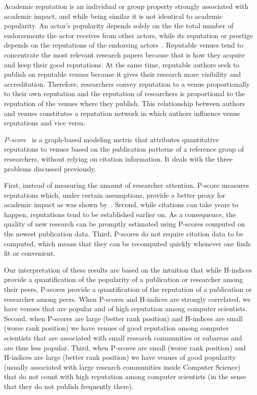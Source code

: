 \documentclass[man]{apa6}
\let \citeA \textcite
\let \cite \parencite
\begin{document}
Academic reputation is an individual or group property strongly associated with 
academic impact, and while being similar it is not identical to academic popularity. An 
actor's popularity depends solely on the the total number of endorsements
the actor receives from other actors, while its reputation or prestige depends on the 
reputations of the endorsing actors~\cite{Bollen2006}. Reputable venues tend to 
concentrate the most relevant research papers 
because that is how they acquire and keep their good reputations. At the same time, 
reputable authors seek to publish on reputable venues because it gives their 
research more visibility and accreditation. Therefore, researchers convey reputation
to a venue proportionally to their own reputation and the reputation of researchers
is proportional to the reputation of the venues where they publish.
This relationship between authors and venues constitutes a reputation network in which 
authors influence venue reputations and vice versa. 

{\em P-score}~\cite{Ribas2015a} is a graph-based modeling metric that attributes quantitative
reputations to venues based on the publication patterns of a reference group of researchers,
without relying on citation information. It deals with the three problems discussed previously. 

First, instead of measuring the amount of researcher attention, P-score measures reputations
which, under certain assumptions, provide a better proxy for academic impact as was shown by~\citeA{Ribas2015a}. Second, while citations can take years to happen, reputations 
tend to be established earlier on. As a consequence, the quality of new research can be 
promptly estimated using P-scores computed on the newest publication data. Third, P-scores do
not require citation data to be computed, which means that they can be recomputed quickly whenever one finds fit or convenient.

Our interpretation of these results are based on the intuition that while H-indices provide a 
quantification of the popularity of a publication or researcher among their peers, P-scores 
provide a quantification of the reputation of a publication or researcher among peers. When
P-scores and H-indices are strongly correlated, we have venues that are popular and of high
reputation among computer scientists. Second, when P-scores are large (better rank position) 
and H-indices are small (worse rank position) we have venues of good reputation among computer
scientists that are associated with small research communities or subareas and are thus less popular. Third, when P-scores
are small (worse rank position) and H-indices are large (better rank position) we have venues of good popularity 
(usually associated with large research communities inside Computer Science) that do not count
with high reputation among computer scientists (in the sense that they do not publish frequently 
there).
\end{document}
